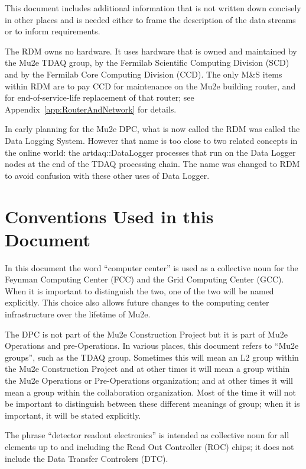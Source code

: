 This document includes additional information that is not written down concisely
in other places and is needed either to frame the description of the data streams
or to inform requirements.


The RDM owns no hardware.  It uses hardware that is owned and maintained
by the Mu2e TDAQ group,
by the Fermilab Scientific Computing Division (SCD)
and by the Fermilab Core Computing Division (CCD).
The only M\&S items within RDM are to pay CCD for maintenance on the Mu2e building router,
and for end-of-service-life replacement of that router;
see Appendix~\ref{app:RouterAndNetwork} for details.

In early planning for the Mu2e DPC, what is now called the RDM was called the Data Logging System.
However that name is too close to two related concepts in the online world:
the {\code artdaq::DataLogger} processes that run on the Data Logger nodes at the end of the TDAQ
processing chain.  The name was changed to RDM to avoid confusion with these other uses of Data Logger.

\section{Conventions Used in this Document}

In this document the word ``computer center'' is used as a collective noun for the
Feynman Computing Center (FCC) and the Grid Computing Center (GCC).
When it is important to distinguish the two, one of the two will be named explicitly.
This choice also allows future changes to the computing center infrastructure over the
lifetime of Mu2e.

The DPC is not part of the Mu2e Construction Project but it is part of Mu2e Operations
and pre-Operations.
In various places, this document refers to ``Mu2e groups'', such as the TDAQ group.
Sometimes this will mean an L2 group within the Mu2e Construction Project and at other
times it will mean a group within the Mu2e Operations or Pre-Operations organization;
and at other times it will mean a group within the collaboration organization.
Most of the time it will not be important to distinguish between these different meanings
of group; when it is important, it will be stated explicitly.

The phrase ``detector readout electronics'' is intended as collective noun for all elements
up to and including the Read Out Controller (ROC) chips; it does not include
the Data Transfer Controlers (DTC).


